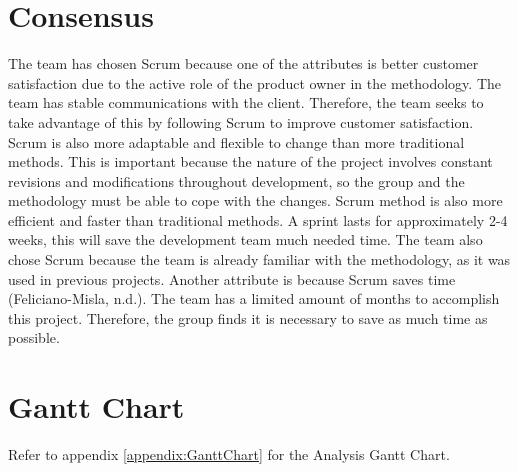 \section{Consensus}
The team has chosen Scrum because one of the attributes is better customer satisfaction due to the active role of the product owner in the methodology. The team has stable communications with the client. Therefore, the team seeks to take advantage of this by following Scrum to improve customer satisfaction. Scrum is also more adaptable and flexible to change than more traditional methods. This is important because the nature of the project involves constant revisions and modifications throughout development, so the group and the methodology must be able to cope with the changes. Scrum method is also more efficient and faster than traditional methods. A sprint lasts for approximately 2-4 weeks, this will save the development team much needed time. The team also chose Scrum because the team is already familiar with the methodology, as it was used in previous projects. Another attribute is because Scrum saves time (Feliciano-Misla, n.d.). The team has a limited amount of months to accomplish this project. Therefore, the group finds it is necessary to save as much time as possible.

\section{Gantt Chart}
Refer to appendix \ref{appendix:GanttChart} for the Analysis Gantt Chart.
